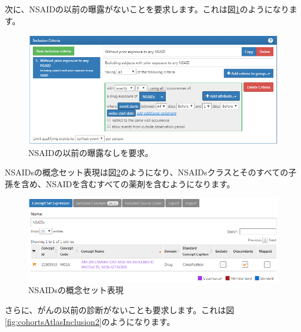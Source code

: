\documentclass[
  11pt]{book}
\theoremstyle{definition}
\theoremstyle{definition}
\theoremstyle{definition}
\theoremstyle{definition}
\theoremstyle{remark}
\begin{document}
次に、NSAIDの以前の曝露がないことを要求します。これは図\ref{fig:cohortsAtlasInclusion1}のようになります。

\begin{figure}

{\centering \includegraphics[width=1\linewidth]{images/SuggestedAnswers/cohortsAtlasInclusion1} 

}

\caption{NSAIDの以前の曝露なしを要求。}\label{fig:cohortsAtlasInclusion1}
\end{figure}

NSAIDsの概念セット表現は図\ref{fig:cohortsAtlasConceptSet2}のようになり、NSAIDsクラスとそのすべての子孫を含め、NSAIDを含むすべての薬剤を含むようになります。

\begin{figure}

{\centering \includegraphics[width=1\linewidth]{images/SuggestedAnswers/cohortsAtlasConceptSet2} 

}

\caption{NSAIDsの概念セット表現}\label{fig:cohortsAtlasConceptSet2}
\end{figure}

さらに、がんの以前の診断がないことも要求します。これは図\ref{fig:cohortsAtlasInclusion2}のようになります。
\end{document}
